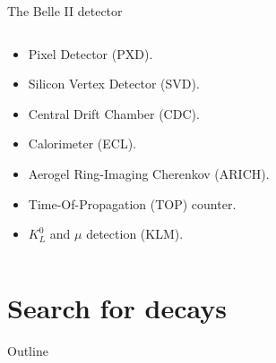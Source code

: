 \begin{frame}{{The Belle II detector}}
\begin{columns}
\begin{column}{0.45\linewidth} 
\begin{itemize} \small
\item Pixel Detector (PXD).
\vspace{0.25cm}
\item Silicon Vertex Detector (SVD).
\vspace{0.25cm}
\item Central Drift Chamber (CDC).
\vspace{0.25cm}
\item Calorimeter (ECL).
\vspace{0.25cm}
\item Aerogel Ring-Imaging Cherenkov (ARICH).
\vspace{0.25cm}
\item Time-Of-Propagation (TOP) counter.
\vspace{0.25cm}
\item $K_L^0$ and $\mu$ detection (KLM).
\end{itemize}
\end{column}
\begin{column}{0.55\linewidth}
\centering
{}
\end{column}
\end{columns}
\end{frame}
\section{Search for \BKpnn decays}
\begin{frame}[noframenumbering]{Outline}
 \tableofcontents[currentsection, subsubsectionstyle=hide]
\end{frame}
